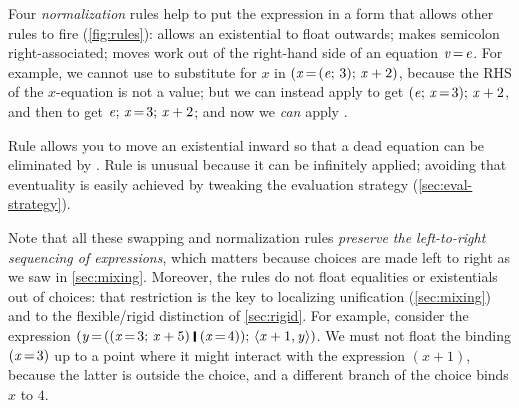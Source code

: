 \documentclass[acmsmall]{acmart}
\newcommand{\Varid}[1]{\mathit{#1}}
\begin{document}
Four \emph{normalization} rules help to put the expression in a form that
allows other rules to fire (\cref{fig:rules}):   allows an existential to float outwards;
 makes semicolon right-associated;  moves work out
of the right-hand side of an equation \ensuremath{\Varid{v}\hspace{-0.14em}=\hspace{-0.14em}\Varid{e}}.
For example, we cannot use  to substitute for \ensuremath{\Varid{x}} in \ensuremath{(\Varid{x}\hspace{-0.14em}=\hspace{-0.14em}(\Varid{e};\,\mathrm{3});\,\Varid{x}\mathbin{+}\mathrm{2})},
because the RHS of the \ensuremath{\Varid{x}}-equation is not a value; but we can instead apply 
to get \ensuremath{(\Varid{e};\,\Varid{x}\hspace{-0.14em}=\hspace{-0.14em}\mathrm{3});\,\Varid{x}\mathbin{+}\mathrm{2}}, and then  to get \ensuremath{\Varid{e};\,\Varid{x}\hspace{-0.14em}=\hspace{-0.14em}\mathrm{3};\,\Varid{x}\mathbin{+}\mathrm{2}}; and now we \emph{can}
apply .

Rule  allows you to move an existential inward so that a dead equation can be eliminated
by .
Rule  is unusual because it can be infinitely applied;
avoiding that eventuality is easily achieved by tweaking the evaluation strategy (\cref{sec:eval-strategy}).

Note that all these swapping and normalization rules \emph{preserve the left-to-right sequencing of expressions},
which matters because choices are made left to right as we saw in \cref{sec:mixing}.
Moreover, the rules do not float equalities or existentials out of choices:
that restriction is the key to localizing unification (\cref{sec:mixing}) and
to the flexible/rigid distinction of
\cref{sec:rigid}. For example, consider the expression
\ensuremath{(\Varid{y}\hspace{-0.14em}=\hspace{-0.14em}((\Varid{x}\hspace{-0.14em}=\hspace{-0.14em}\mathrm{3};\,\Varid{x}\mathbin{+}\mathrm{5})\;\rule[-0.1em]{0.15em}{0.75em}\;(\Varid{x}\hspace{-0.14em}=\hspace{-0.14em}\mathrm{4}));\,\langle{}\Varid{x}\mathbin{+}\mathrm{1},\Varid{y}\rangle)}.
We must not float the binding \ensuremath{(\Varid{x}\hspace{-0.14em}=\hspace{-0.14em}\mathrm{3})} up to a point where it might interact with the expression \ensuremath{(\Varid{x}\mathbin{+}\mathrm{1})},
because the latter is outside the choice, and a different branch of the choice binds \ensuremath{\Varid{x}} to \ensuremath{\mathrm{4}}.
\end{document}
